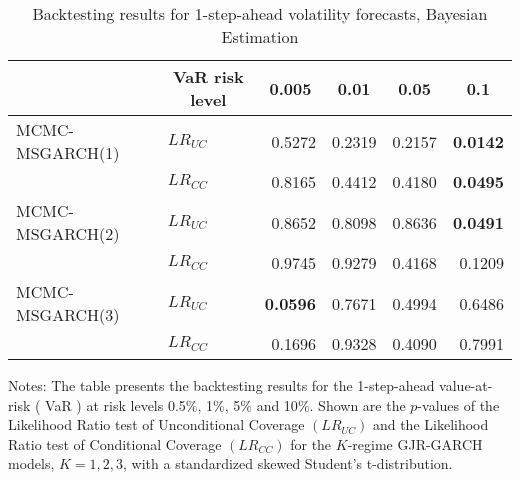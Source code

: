 \documentclass[12pt,a4paper]{article}
\begin{document}
\begin{table}[p]
\centering
\begin{threeparttable}
\caption {Backtesting results for 1-step-ahead volatility forecasts, Bayesian Estimation}
\label{table:backtest_mcmc}
\begin{tabular}{llrrrr}
\hline
                & \multicolumn{1}{c}{VaR risk level} & \multicolumn{1}{c}{0.005} & \multicolumn{1}{c}{0.01} & \multicolumn{1}{c}{0.05} & \multicolumn{1}{c}{0.1} \\ \hline
MCMC-MSGARCH(1) & $LR_{UC}$                          & 0.5272                    & 0.2319                   & 0.2157                   & \textbf{0.0142}         \\
                & $LR_{CC}$                          & 0.8165                    & 0.4412                   & 0.4180                   & \textbf{0.0495}         \\
MCMC-MSGARCH(2) & $LR_{UC}$                          & 0.8652                    & 0.8098                   & 0.8636                   & \textbf{0.0491}         \\
                & $LR_{CC}$                          & 0.9745                    & 0.9279                   & 0.4168                   & 0.1209                  \\
MCMC-MSGARCH(3) & $LR_{UC}$                          & \textbf{0.0596}           & 0.7671                   & 0.4994                   & 0.6486                  \\
                & $LR_{CC}$                          & 0.1696                    & 0.9328                   & 0.4090                   & 0.7991                  \\ \hline
\end{tabular}
\begin{tablenotes}
\small
\item Notes: The table presents the backtesting results for the 1-step-ahead value-at-risk ( VaR ) at risk levels 0.5$\%$, 1$\%$, 5$\%$ and 10$\%$. Shown are the $p$-values of the Likelihood Ratio test of Unconditional Coverage $(LR_{UC})$ and the Likelihood Ratio test of Conditional Coverage $(LR_{CC})$ for the $K$-regime GJR-GARCH \citep{glosten1993relation} models, $K = 1,2,3$, with a standardized skewed Student's t-distribution.
\end{tablenotes}
\end{threeparttable}
\end{table}
\end{document}
